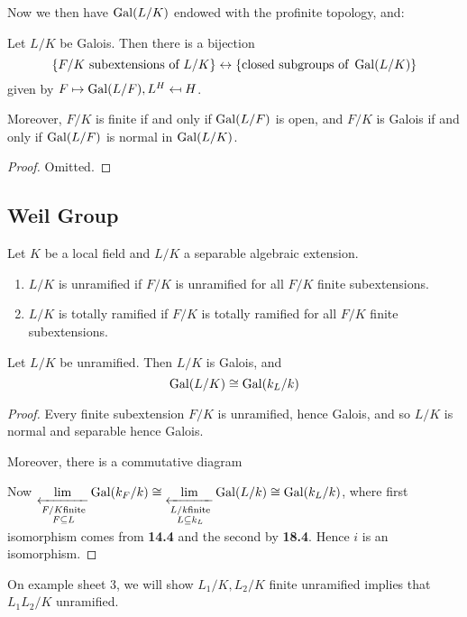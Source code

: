 \documentclass[10pt,a4paper]{article}
\begin{document}
Now we then have $\operatorname{Gal}(L/K)$ endowed with the profinite topology, and:
\begin{theorem}
  Let $L/K$ be Galois. Then there is a bijection
  \[\{F/K \text{ subextensions of }L/K\} \leftrightarrow \{\text{closed subgroups of }\operatorname{Gal}(L/K)\}\]
  given by $F \mapsto \operatorname{Gal}(L/F), L^H \mapsfrom H$.

  Moreover, $F/K$ is finite if and only if $\operatorname{Gal}(L/F)$ is open, and $F/K$ is Galois if and only if $\operatorname{Gal}(L/F)$ is normal in $\operatorname{Gal}(L/K)$.
\end{theorem}
\begin{proof}
  Omitted.
\end{proof}
\subsection{Weil Group}
Let $K$ be a local field and $L/K$ a separable algebraic extension.
\begin{definition}\hspace*{0cm}
  \begin{enumerate}
    \item $L/K$ is unramified if $F/K$ is unramified for all $F/K$ finite subextensions.
    \item $L/K$ is totally ramified if $F/K$ is totally ramified for all $F/K$ finite subextensions.
  \end{enumerate}
\end{definition}
\begin{proposition}
  Let $L/K$ be unramified. Then $L/K$ is Galois, and
  \[\operatorname{Gal}(L/K) \cong \operatorname{Gal}(k_L/k)\]
\end{proposition}
\begin{proof}
  Every finite subextension $F/K$ is unramified, hence Galois, and so $L/K$ is normal and separable hence Galois.

  Moreover, there is a commutative diagram
  \begin{center}
  \end{center}
  Now $\lim\limits_{\xleftarrow[\substack{F/K \text{finite}\\ F\subseteq L}]{}}\operatorname{Gal}(k_F/k) \cong \lim\limits_{\xleftarrow[\substack{L/k \text{finite}\\ L\subseteq k_L}]{}}\operatorname{Gal}(L/k) \cong \operatorname{Gal}(k_L/k)$, where first isomorphism comes from \textbf{14.4} and the second by \textbf{18.4}. Hence $i$ is an isomorphism.
\end{proof}
On example sheet 3, we will show $L_1/K, L_2/K$ finite unramified implies that $L_1L_2/K$ unramified.
\end{document}
